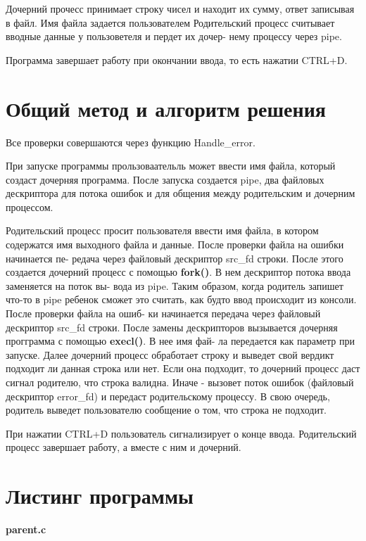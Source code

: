 \documentclass[pdf, unicode, 12pt, a4paper,oneside,fleqn]{article}
\begin{document}
Дочерний прочесс принимает строку чисел и находит их сумму, ответ записывая в
файл. Имя файла задается пользователем
Родительский процесс считывает вводные данные у пользоветеля и пердет их дочер-
нему процессу через pipe.

Программа завершает работу при окончании ввода, то есть нажатии CTRL+D.

\section{Общий метод и алгоритм решения}
Все проверки совершаются через функцию Handle\_error.

При запуске программы прользоваательль может ввести имя файла, который создаст
дочерняя программа.
После запуска создается pipe, два файловых дескриптора для потока ошибок и для
общения между родительским и дочерним процессом.

Родительский процесс просит пользователя ввести имя файла, в котором содержатся
имя выходного файла и данные. После проверки файла на ошибки начинается пе-
редача через файловый дескриптор src\_fd строки. После этого создается дочерний
процесс с помощью \textbf{fork()}. В нем дескриптор потока ввода заменяется на поток вы-
вода из pipe. Таким образом, когда родитель запишет что-то в pipe ребенок сможет
это считать, как будто ввод происходит из консоли. После проверки файла на ошиб-
ки начинается передача через файловый дескриптор src\_fd строки. После замены
дескрипторов вызывается дочерняя прогграмма с помощью \textbf{execl()}. В нее имя фай-
ла передается как параметр при запуске. Далее дочерний процесс обработает строку
и выведет свой вердикт подходит ли данная строка или нет. Если она подходит, то
дочерний процесс даст сигнал родителю, что строка валидна. Иначе - вызовет поток
ошибок (файловый дескриптор error\_fd) и передаст родительскому процессу. В свою
очередь, родитель выведет пользователю сообщение о том, что строка не подходит.

При нажатии CTRL+D пользователь сигнализирует о конце ввода. Родительский
процесс завершает работу, а вместе с ним и дочерний.

\section{Листинг программы}
{\large\textbf{parent.c}}
\end{document}
